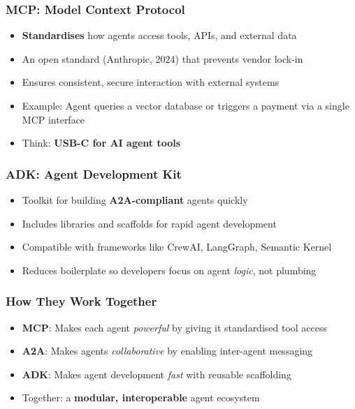 \begin{frame}[fragile]\frametitle{MCP: Model Context Protocol}
    \begin{itemize}
        \item \textbf{Standardises} how agents access tools, APIs, and external data
        \item An open standard (Anthropic, 2024) that prevents vendor lock-in
        \item Ensures consistent, secure interaction with external systems
        \item Example: Agent queries a vector database or triggers a payment via a single MCP interface
        \item Think: \textbf{USB-C for AI agent tools}
    \end{itemize}
\end{frame}

\begin{frame}[fragile]\frametitle{ADK: Agent Development Kit}
    \begin{itemize}
        \item Toolkit for building \textbf{A2A-compliant} agents quickly
        \item Includes libraries and scaffolds for rapid agent development
        \item Compatible with frameworks like CrewAI, LangGraph, Semantic Kernel
        \item Reduces boilerplate so developers focus on agent \emph{logic}, not plumbing
    \end{itemize}
\end{frame}

\begin{frame}[fragile]\frametitle{How They Work Together}
    \begin{itemize}
        \item \textbf{MCP}: Makes each agent \emph{powerful} by giving it standardised tool access
        \item \textbf{A2A}: Makes agents \emph{collaborative} by enabling inter-agent messaging
        \item \textbf{ADK}: Makes agent development \emph{fast} with reusable scaffolding
        \item Together: a \textbf{modular, interoperable} agent ecosystem
    \end{itemize}
\end{frame}

